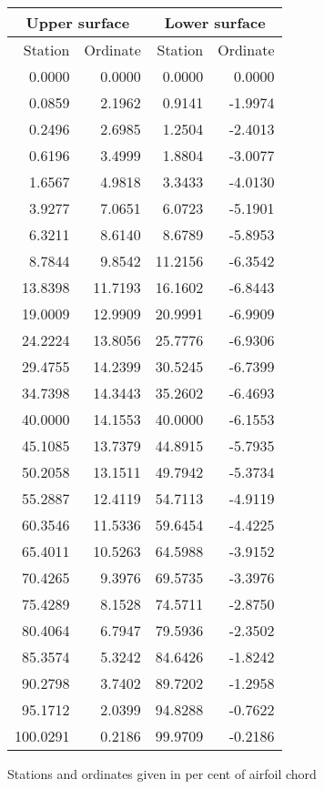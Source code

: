 \documentclass[11pt]{book}
\begin{document}
 \hspace{4mm}
 \begin{tabular}{|r|r|r|r|} \hline 
 \multicolumn{2}{|c|}{Upper surface} & \multicolumn{2}{|c|}{Lower surface} \\
 \hline
 Station & Ordinate & Station & Ordinate \\
 \hline
0.0000 & 0.0000 & 0.0000 & 0.0000 \\
0.0859 & 2.1962 & 0.9141 & -1.9974 \\
0.2496 & 2.6985 & 1.2504 & -2.4013 \\
0.6196 & 3.4999 & 1.8804 & -3.0077 \\
1.6567 & 4.9818 & 3.3433 & -4.0130 \\
3.9277 & 7.0651 & 6.0723 & -5.1901 \\
6.3211 & 8.6140 & 8.6789 & -5.8953 \\
8.7844 & 9.8542 & 11.2156 & -6.3542 \\
13.8398 & 11.7193 & 16.1602 & -6.8443 \\
19.0009 & 12.9909 & 20.9991 & -6.9909 \\
24.2224 & 13.8056 & 25.7776 & -6.9306 \\
29.4755 & 14.2399 & 30.5245 & -6.7399 \\
34.7398 & 14.3443 & 35.2602 & -6.4693 \\
40.0000 & 14.1553 & 40.0000 & -6.1553 \\
45.1085 & 13.7379 & 44.8915 & -5.7935 \\
50.2058 & 13.1511 & 49.7942 & -5.3734 \\
55.2887 & 12.4119 & 54.7113 & -4.9119 \\
60.3546 & 11.5336 & 59.6454 & -4.4225 \\
65.4011 & 10.5263 & 64.5988 & -3.9152 \\
70.4265 & 9.3976 & 69.5735 & -3.3976 \\
75.4289 & 8.1528 & 74.5711 & -2.8750 \\
80.4064 & 6.7947 & 79.5936 & -2.3502 \\
85.3574 & 5.3242 & 84.6426 & -1.8242 \\
90.2798 & 3.7402 & 89.7202 & -1.2958 \\
95.1712 & 2.0399 & 94.8288 & -0.7622 \\
100.0291 & 0.2186 & 99.9709 & -0.2186 \\
 \hline 
 \end{tabular}
 \vspace{8mm}

Stations and ordinates given in per cent of airfoil chord
\end{document}
